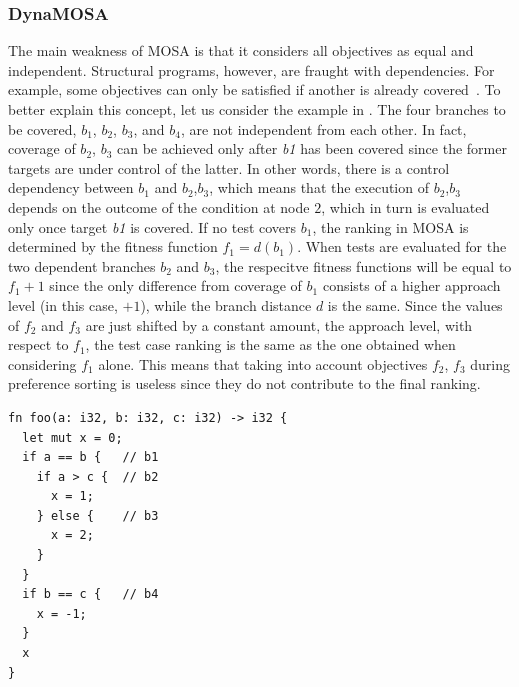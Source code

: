 \documentclass[paper=a4,%
  twoside,%
  BCOR4mm,%
  abstract=true,%
  toc=bibliography,%
  chapterprefix=true,%
  toc=bibliographynumbered,%
  open=right,%
  english,%
  pagesize=pdftex]{scrreprt}
\begin{document}
\subsubsection{DynaMOSA}
The main weakness of \ac{MOSA} is that it considers all objectives as equal and independent. Structural programs, however, are fraught with dependencies. For example, some objectives can only be satisfied if another is already covered~\cite{Fraser_2013}. To better explain this concept, let us consider the example in . The four branches to be covered, $b_1$, $b_2$, $b_3$, and $b_4$, are not independent from each other. In fact, coverage of $b_2$, $b_3$ can be achieved only after \textit{b1} has been covered since the former targets are under control of the latter. In other words, there is a control dependency between $b_1$ and $b_2$,$b_3$, which means that the execution of $b_2$,$b_3$ depends on the outcome of the condition at node $2$, which in turn is evaluated only once target \textit{b1} is covered. If no test covers $b_1$, the ranking in \ac{MOSA} is determined by the fitness function $f_1 = d(b_1)$. When tests are evaluated for the two dependent branches $b_2$ and $b_3$, the respecitve fitness functions will be equal to $f_1 + 1$ since the only difference from coverage of $b_1$ consists of a higher approach level (in this case, $+1$), while the branch distance $d$ is the same. Since the values of $f_2$ and $f_3$ are just shifted by a constant amount, the approach level, with respect to $f_1$, the test case ranking is the same as the one obtained when considering $f_1$ alone. This means that taking into account objectives $f_2$, $f_3$ during preference sorting is useless since they do not contribute to the final ranking.

\begin{lstlisting}[style=boxed, caption={A nested function with control dependent blocks}, label=lst:example-control-dependencies]
fn foo(a: i32, b: i32, c: i32) -> i32 {
  let mut x = 0;
  if a == b {   // b1
    if a > c {  // b2
      x = 1;
    } else {    // b3
      x = 2;
    }
  }
  if b == c {   // b4
    x = -1;
  }
  x
}
\end{lstlisting}
\end{document}
